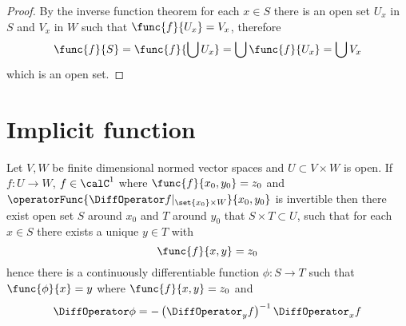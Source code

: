 \begin{proof}
    By the inverse function theorem for each \(x \in S\) there is an open set \(U_x\) in \(S\) and \(V_x\) in \(W\) such that \(\func{f}{U_x} = V_x\), therefore
    \begin{equation*}
        \func{f}{S} =  \func{f}{\bigcup U_x} = \bigcup \func{f}{U_x} = \bigcup V_x
    \end{equation*}
    which is an open set.
\end{proof}

\section{Implicit function}
\begin{theorem}
    Let \(V,W\) be finite dimensional normed vector spaces and \(U \subset V \times W\) is open. If \(f: U \to W\), \(f \in \calC^1\) where \(\func{f}{x_0,y_0} = z_0\) and \(\operatorFunc{\DiffOperator f|_{\set{x_0} \times W}}{x_0,y_0}\) is invertible then there exist open set \(S\) around \(x_0\) and \(T\) around \(y_0\) that \(S \times T \subset U\), such that for each \(x \in S\) there exists a unique \(y \in T\) with
    \begin{equation*}
        \func{f}{x,y} = z_0
    \end{equation*}
    hence there is a continuously differentiable function \(\phi: S \to T\) such that \(\func{\phi}{x} = y\) where \(\func{f}{x,y} = z_0\) and
    \begin{equation*}
        \DiffOperator \phi = - \left(\DiffOperator_y f\right)^{-1} \DiffOperator_x f
    \end{equation*}
\end{theorem}

